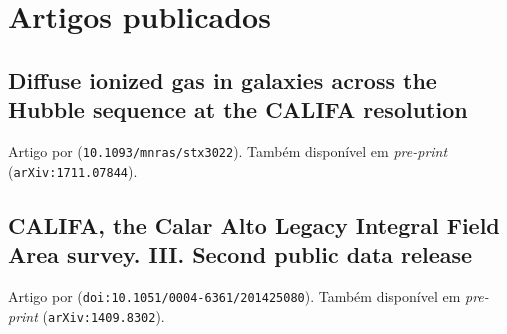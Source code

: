 

\chapter{Artigos publicados}

\section{Diffuse ionized gas in galaxies across the Hubble sequence at the CALIFA resolution}
\label{apendice:DIGpaper0}

Artigo por \cite{Lacerda.etal.2018} (\texttt{10.1093/mnras/stx3022}).
Também disponível em {\em pre-print} (\texttt{arXiv:1711.07844}).

\cleardoublepage



\section{CALIFA, the Calar Alto Legacy Integral Field Area survey. III. Second public data release}
\label{apendice:GBetal2015a}

Artigo por \cite{GarciaBenito.etal.2015a} (\texttt{doi:10.1051/0004-6361/201425080}).
Também disponível em {\em pre-print} (\texttt{arXiv:1409.8302}).

\cleardoublepage



%
%
%
% 
%
%
%
%
% 


